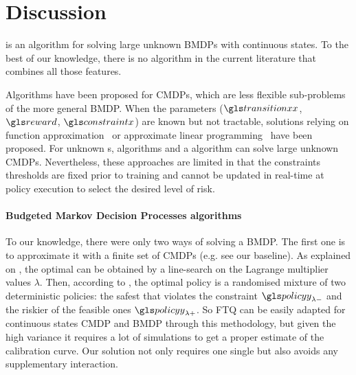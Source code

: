 

\section{Discussion}
\label{subsec:discussions}
 is an algorithm for solving large unknown \glspl{BMDP} with continuous states. To the best of our knowledge, there is no algorithm in the current literature that combines all those features.

Algorithms have been proposed for \glspl{CMDP}, which are less flexible sub-problems of the more general \gls{BMDP}. When the  parameters ($\transition$, $\reward$, $\constraint$) are known but not tractable, solutions relying on function approximation~\parencite{Undurti} or approximate linear programming~\parencite{Poupart2015} have been proposed. For unknown s,  algorithms \parencite{Geibel2005, Abe2010,AchiamHTA17,ChowGJP15} and a  algorithm \parencite{Thomas2015, Petrik2016, laroche2019,nadjahi2019safe,le2019batch} can solve large unknown \glspl{CMDP}. Nevertheless, these approaches are limited in that the constraints thresholds are fixed prior to training and cannot be updated in real-time at policy execution to select the desired level of risk.


\paragraph{Budgeted Markov Decision Processes algorithms}

To our knowledge, there were only two ways of solving a \gls{BMDP}. The first one is to approximate it with a finite set of \glspl{CMDP} (e.g. see our \FTQl baseline). As explained on , the optimal  can be obtained by a line-search on the Lagrange multiplier values $\lambda$. Then, according to \textcite[Theorem 4.4]{BEUTLER1985236}, the optimal policy is a randomised mixture of two deterministic policies: the safest  that violates the constraint $\policy_{\lambda-}$ and the riskier of the feasible ones $\policy_{\lambda+}$. So \gls{FTQ} can be easily adapted for continuous states \gls{CMDP} and \gls{BMDP} through this methodology, but given the high variance it requires a lot of simulations to get a proper estimate of the calibration curve. Our solution not only requires one single  but also avoids any supplementary interaction.

